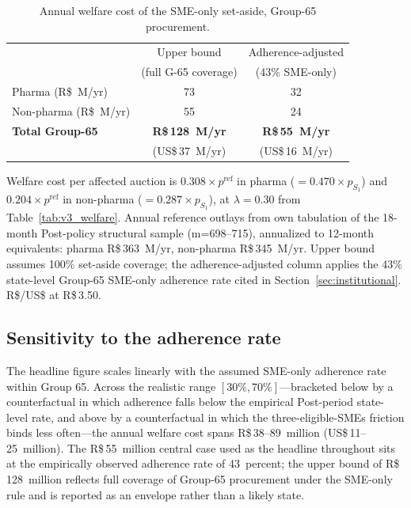 \begin{table}[!htbp]
\centering
\begin{threeparttable}
\caption{Annual welfare cost of the SME-only set-aside, Group-65 procurement.}
\label{tab:welfare_annual}
\small
\setlength{\tabcolsep}{6pt}
\begin{tabular}{lcc}
\toprule
                            & Upper bound          & Adherence-adjusted \\
                            & (full G-65 coverage)  & (43\% SME-only)    \\
\midrule
Pharma          (R\$~M/yr)  & 73    & 32   \\
Non-pharma      (R\$~M/yr)  & 55    & 24   \\
\addlinespace
\textbf{Total Group-65}     & \textbf{R\$\,128~M/yr} & \textbf{R\$\,55~M/yr}  \\
                            & (US\$\,37~M/yr)        & (US\$\,16~M/yr)        \\
\bottomrule
\end{tabular}
\begin{tablenotes}\footnotesize
\item Welfare cost per affected auction is $0.308 \times p^{\mathrm{ref}}$ in pharma ($= 0.470 \times p_{S_1}$) and $0.204 \times p^{\mathrm{ref}}$ in non-pharma ($= 0.287 \times p_{S_1}$), at $\lambda = 0.30$ from Table~\ref{tab:v3_welfare}. Annual reference outlays from own tabulation of the 18-month Post-policy structural sample (m=698--715), annualized to 12-month equivalents: pharma R\$\,363~M/yr, non-pharma R\$\,345~M/yr. Upper bound assumes 100\% set-aside coverage; the adherence-adjusted column applies the 43\% state-level Group-65 SME-only adherence rate cited in Section~\ref{sec:institutional}. R\$/US\$ at R\$\,3.50.
\end{tablenotes}
\end{threeparttable}
\end{table}

\subsection{Sensitivity to the adherence rate}\label{sec:adherence_sensitivity}

The headline figure scales linearly with the assumed SME-only adherence rate within Group 65. Across the realistic range $[30\%, 70\%]$---bracketed below by a counterfactual in which adherence falls below the empirical Post-period state-level rate, and above by a counterfactual in which the three-eligible-SMEs friction binds less often---the annual welfare cost spans R\$\,38--89~million (US\$\,11--25~million). The R\$\,55~million central case used as the headline throughout sits at the empirically observed adherence rate of 43~percent; the upper bound of R\$\,128~million reflects full coverage of Group-65 procurement under the SME-only rule and is reported as an envelope rather than a likely state.

